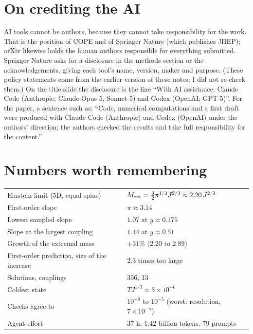 \documentclass[12pt,a4paper]{article}
\begin{document}
\section*{On crediting the AI}

AI tools cannot be authors, because they cannot take responsibility for the work.
That is the position of COPE and of Springer Nature (which publishes JHEP); arXiv
likewise holds the human authors responsible for everything submitted. Springer
Nature asks for a disclosure in the methods section or the acknowledgements, giving
each tool's name, version, maker and purpose. (These policy statements come from the
earlier version of these notes; I did not re-check them.) On the title slide the
disclosure is the line ``With AI assistance: Claude Code (Anthropic; Claude Opus 5,
Sonnet 5) and Codex (OpenAI; GPT-5)''. For the paper, a sentence such as: ``Code,
numerical computations and a first draft were produced with Claude Code (Anthropic)
and Codex (OpenAI) under the authors' direction; the authors checked the results
and take full responsibility for the content.''

\section*{Numbers worth remembering}

\begin{center}\small
\begin{tabular}{@{}ll@{}}
\hline
Einstein limit (5D, equal spins) & $M_{\rm ext}=\tfrac32\pi^{1/3}J^{2/3}\approx 2.20\,J^{2/3}$ \\
First-order slope & $\pi\approx 3.14$ \\
Lowest sampled slope & $1.07$ at $y\approx0.175$ \\
Slope at the largest coupling & $1.44$ at $y\approx0.51$ \\
Growth of the extremal mass & $+31\%$ (2.20 to 2.89) \\
First-order prediction, size of the increase & 2.3 times too large \\
Solutions, couplings & 356, 13 \\
Coldest state & $TJ^{1/3}\approx3\times10^{-6}$ \\
Checks agree to & $10^{-9}$ to $10^{-5}$ (worst: resolution, $7\times10^{-5}$) \\
Agent effort & 37 h, 1.42 billion tokens, 79 prompts \\ \hline
\end{tabular}
\end{center}
\end{document}
